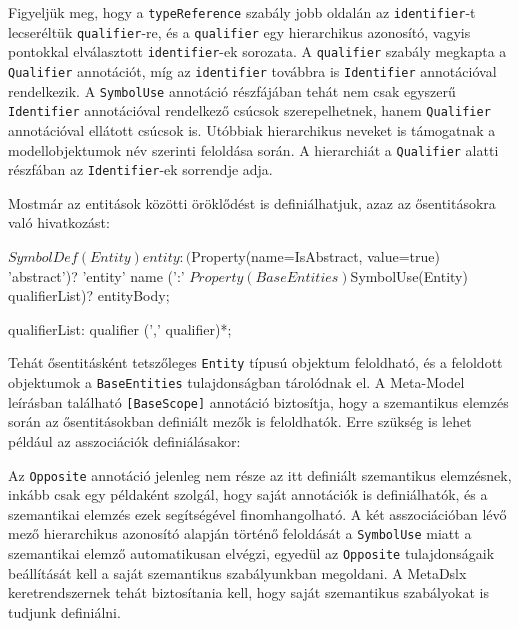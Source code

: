 \documentclass[12pt, a4paper]{report}
\newcommand{\f}[1]{\texttt{#1}}
\begin{document}
Figyeljük meg, hogy a \f{typeReference} szabály jobb oldalán az \f{identifier}-t lecseréltük \f{qualifier}-re, és a \f{qualifier} egy hierarchikus azonosító, vagyis pontokkal elválasztott \f{identifier}-ek sorozata. A \f{qualifier} szabály megkapta a \f{Qualifier} annotációt, míg az \f{identifier} továbbra is \f{Identifier} annotációval rendelkezik. A \f{SymbolUse} annotáció részfájában tehát nem csak egyszerű \f{Identifier} annotációval rendelkező csúcsok szerepelhetnek, hanem \f{Qualifier} annotációval ellátott csúcsok is. Utóbbiak hierarchikus neveket is támogatnak a modellobjektumok név szerinti feloldása során. A hierarchiát a \f{Qualifier} alatti részfában az \f{Identifier}-ek sorrendje adja.

Mostmár az entitások közötti öröklődést is definiálhatjuk, azaz az ősentitásokra való hivatkozást:

\begin{antlr4code}
$SymbolDef(Entity)
entity: ($Property(name=IsAbstract, value=true) 'abstract')? 'entity' name (':' $Property(BaseEntities) $SymbolUse(Entity) qualifierList)? entityBody;

qualifierList: qualifier (',' qualifier)*;
\end{antlr4code}

Tehát ősentitásként tetszőleges \f{Entity} típusú objektum feloldható, és a feloldott objektumok a \f{BaseEntities} tulajdonságban tárolódnak el. A Meta-Model leírásban található \f{[BaseScope]} annotáció biztosítja, hogy a szemantikus elemzés során az ősentitásokban definiált mezők is feloldhatók. Erre szükség is lehet például az asszociációk definiálásakor:


Az \f{Opposite} annotáció jelenleg nem része az itt definiált szemantikus elemzésnek, inkább csak egy példaként szolgál, hogy saját annotációk is definiálhatók, és a szemantikai elemzés ezek segítségével finomhangolható. A két asszociációban lévő mező hierarchikus azonosító alapján történő feloldását a \f{SymbolUse} miatt a szemantikai elemző automatikusan elvégzi, egyedül az \f{Opposite} tulajdonságaik beállítását kell a saját szemantikus szabályunkban megoldani. A MetaDslx keretrendszernek tehát biztosítania kell, hogy saját szemantikus szabályokat is tudjunk definiálni.
\end{document}
